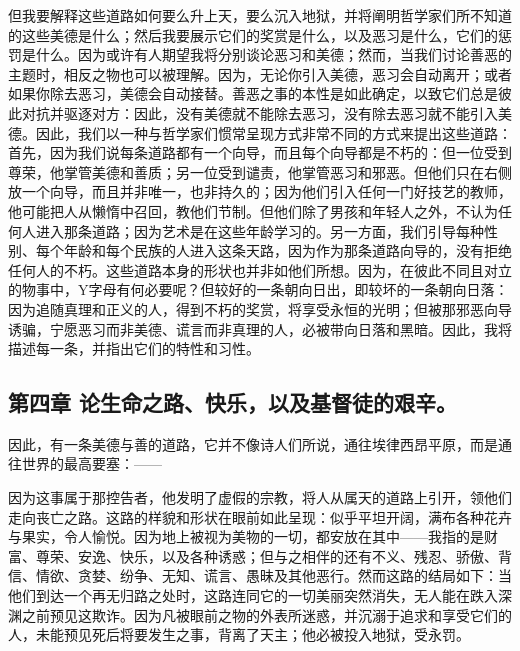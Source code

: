 但我要解释这些道路如何要么升上天，要么沉入地狱，并将阐明哲学家们所不知道的这些美德是什么；然后我要展示它们的奖赏是什么，以及恶习是什么，它们的惩罚是什么。因为或许有人期望我将分别谈论恶习和美德；然而，当我们讨论善恶的主题时，相反之物也可以被理解。因为，无论你引入美德，恶习会自动离开；或者如果你除去恶习，美德会自动接替。善恶之事的本性是如此确定，以致它们总是彼此对抗并驱逐对方：因此，没有美德就不能除去恶习，没有除去恶习就不能引入美德。因此，我们以一种与哲学家们惯常呈现方式非常不同的方式来提出这些道路：首先，因为我们说每条道路都有一个向导，而且每个向导都是不朽的：但一位受到尊荣，他掌管美德和善质；另一位受到谴责，他掌管恶习和邪恶。但他们只在右侧放一个向导，而且并非唯一，也非持久的；因为他们引入任何一门好技艺的教师，他可能把人从懒惰中召回，教他们节制。但他们除了男孩和年轻人之外，不认为任何人进入那条道路；因为艺术是在这些年龄学习的。另一方面，我们引导每种性别、每个年龄和每个民族的人进入这条天路，因为作为那条道路向导的，没有拒绝任何人的不朽。这些道路本身的形状也并非如他们所想。因为，在彼此不同且对立的物事中，Y字母有何必要呢？但较好的一条朝向日出，即较坏的一条朝向日落：因为追随真理和正义的人，得到不朽的奖赏，将享受永恒的光明；但被那邪恶向导诱骗，宁愿恶习而非美德、谎言而非真理的人，必被带向日落和黑暗。因此，我将描述每一条，并指出它们的特性和习性。\par


\subsection{第四章 论生命之路、快乐，以及基督徒的艰辛。}

因此，有一条美德与善的道路，它并不像诗人们所说，通往埃律西昂平原，而是通往世界的最高要塞：——\par

\par

因为这事属于那控告者，他发明了虚假的宗教，将人从属天的道路上引开，领他们走向丧亡之路。这路的样貌和形状在眼前如此呈现：似乎平坦开阔，满布各种花卉与果实，令人愉悦。因为地上被视为美物的一切，都安放在其中——我指的是财富、尊荣、安逸、快乐，以及各种诱惑；但与之相伴的还有不义、残忍、骄傲、背信、情欲、贪婪、纷争、无知、谎言、愚昧及其他恶行。然而这路的结局如下：当他们到达一个再无归路之处时，这路连同它的一切美丽突然消失，无人能在跌入深渊之前预见这欺诈。因为凡被眼前之物的外表所迷惑，并沉溺于追求和享受它们的人，未能预见死后将要发生之事，背离了天主；他必被投入地狱，受永罚。\par

